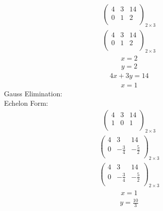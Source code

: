 \documentclass{article}
\begin{document}
\begin{align*}
\left(
\begin{array}{cc|c}
4 & 3 & 14\\
0 & 1 & 2\\
\end{array}
\right)_{2\times 3}
\end{align*}
\begin{align*}
\left(
\begin{array}{cc|c}
4 & 3 & 14\\
0 & 1 & 2\\
\end{array}
\right)_{2\times 3}
\end{align*}
\begin{align*}
x=2\end{align*}
\begin{align*}
y=2\end{align*}
\begin{align*}
4x + 3y=14\end{align*}
\begin{align*}
x=1\end{align*}
Gauss Elimination:\\
Echelon Form:\\
\begin{align*}
\left(
\begin{array}{cc|c}
4 & 3 & 14\\
1 & 0 & 1\\
\end{array}
\right)_{2\times 3}
\end{align*}
\begin{align*}
\left(
\begin{array}{cc|c}
4 & 3 & 14\\
0 & -\frac{3}{4} & -\frac{5}{2}\\
\end{array}
\right)_{2\times 3}
\end{align*}
\begin{align*}
\left(
\begin{array}{cc|c}
4 & 3 & 14\\
0 & -\frac{3}{4} & -\frac{5}{2}\\
\end{array}
\right)_{2\times 3}
\end{align*}
\begin{align*}
x=1\end{align*}
\begin{align*}
y=\frac{10}{3}\end{align*}
\end{document}
